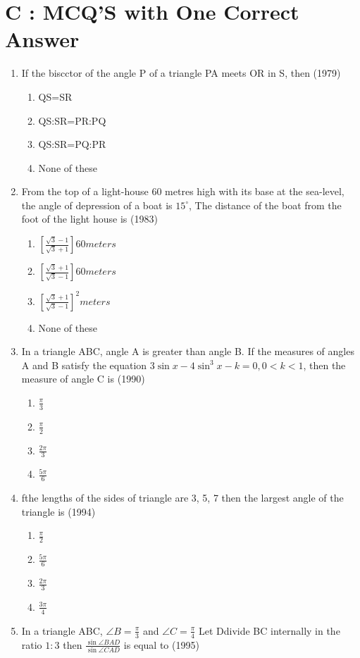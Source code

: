 \documentclass[12pt]{article}
\providecommand{\sbrak}[1]{\ensuremath{{}\left[#1\right]}}
\begin{document}
\section*{C  :   MCQ'S with One Correct Answer}

\begin{enumerate}
\item If the biscctor of the angle P of a triangle PA meets OR in S, then (1979)
\begin{enumerate}
\item QS=SR
\item QS:SR=PR:PQ
\item QS:SR=PQ:PR
\item None of these 
\end{enumerate}
\item From the top of a light-house 60 metres high with its base at the sea-level, the angle of depression of a boat is $15^\circ$, The distance of the boat from the foot of the light house is (1983)
\begin{enumerate}
\item $\sbrak{\frac{\sqrt{3}-1}{\sqrt{3}+1}}60meters$
\item $\sbrak{\frac{\sqrt{3}+1}{\sqrt{3}-1}}60meters$
\item $\sbrak{\frac{\sqrt{3}+1}{\sqrt{3}-1}}^2 meters$
\item None of these 
\end{enumerate}
\item In a triangle ABC, angle A is greater than angle B. If the measures of angles A and B satisfy the equation $3\sin x-4\sin^3x-k=0,0<k<1$, then the measure of angle C is (1990)
\begin{enumerate}
\item  $\frac{\pi}{3}$
\item  $\frac{\pi}{2}$
\item  $\frac{2\pi}{3}$
\item  $\frac{5\pi}{6}$
\end{enumerate}
\item fthe lengths of the sides of triangle are 3, 5, 7 then the largest angle of the triangle is (1994)
\begin{enumerate}
\item $\frac{\pi}{2}$
\item  $\frac{5\pi}{6}$
\item  $\frac{2\pi}{3}$
\item  $\frac{3\pi}{4}$
\end{enumerate}
\item  In a triangle ABC, $\angle B=\frac{\pi}{3}$ and $\angle C= \frac{\pi}{4}$ Let Ddivide BC internally in the ratio $1:3$ then $\frac{\sin \angle BAD}{\sin \angle CAD}$ is equal to (1995)

\end{enumerate}
\end{document}
